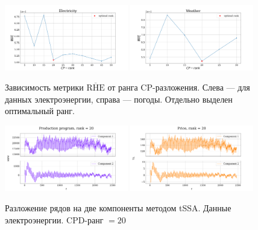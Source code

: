 	\begin{figure}[h!]
		\centering
		\includegraphics[width=0.48\textwidth, keepaspectratio]{../../experiments/electricity/tssa/figs/decomposition/RHE_mean.png}
		\includegraphics[width=0.48\textwidth, keepaspectratio]{../../experiments/weather/tssa/figs/decomposition/RHE_mean.png}
		\caption{Зависимость метрики $ \overline{\text{RHE}} $ от ранга CP-разложения. Слева --- для данных электроэнергии, справа --- погоды. Отдельно выделен оптимальный ранг.}\label{fig:decomp_rhe_rank}
	\end{figure}
	
	\begin{figure}[h!]
		\centering
		\includegraphics[width=0.48\textwidth, keepaspectratio]{../../experiments/electricity/tssa/figs/decomposition/cpd_rank_20/Production_program.png}
		\includegraphics[width=0.48\textwidth, keepaspectratio]{../../experiments/electricity/tssa/figs/decomposition/cpd_rank_20/Price.png}
		\caption{Разложение рядов на две компоненты методом tSSA. Данные электроэнергии. CPD-ранг $ = 20 $}\label{fig:electr_decomp_tssa}
	\end{figure}
	
